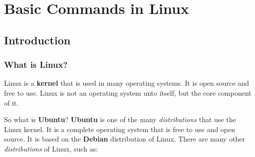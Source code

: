 \setchapterpreamble[u]{\margintoc}
\chapter{Basic Commands in Linux}

\section{Introduction}

\subsection{What is Linux?}

\begin{definition}[Linux]
  Linux is a \textbf{kernel} that is used in many operating systems. It is open source and free to use. Linux is not an operating system unto itself, but the core component of it.
\end{definition}

So what is \textbf{Ubuntu}? \textbf{Ubuntu} is one of the many \textit{distributions} that use the Linux kernel. It is a complete operating system that is free to use and open source. It is based on the \textbf{Debian} distribution of Linux. There are many other \textit{distributions} of Linux, such as:

